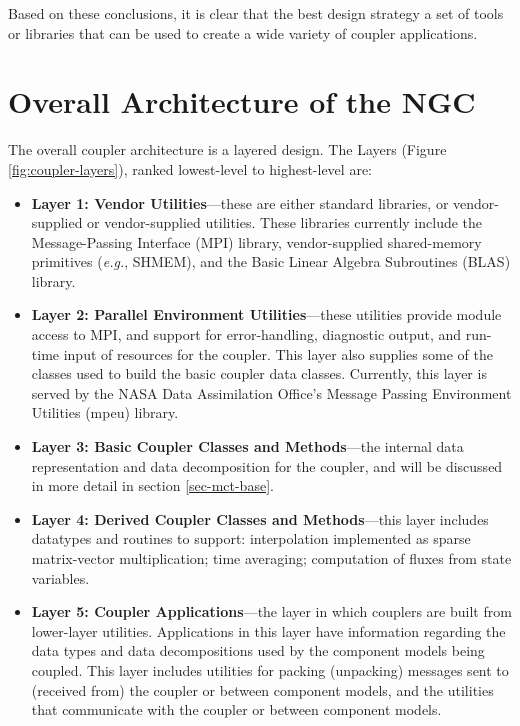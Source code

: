 \documentclass{article}
\begin{document}
Based on these conclusions, it is clear that the best design
strategy a set of tools or libraries that can be used to create a
wide variety of coupler applications.



\section{Overall Architecture of the NGC}\label{sec-arch}

The overall coupler architecture is a layered design.  The Layers
(Figure \ref{fig:coupler-layers}), ranked lowest-level to
highest-level are:
\begin{itemize}
\item {\bf Layer 1:  Vendor Utilities}---these are either standard
libraries, or vendor-supplied or vendor-supplied utilities.  These
libraries currently include the Message-Passing Interface (MPI)
library, vendor-supplied shared-memory primitives ({\em e.g.},
SHMEM), and the Basic Linear Algebra Subroutines (BLAS) library.
\item {\bf Layer 2:  Parallel Environment Utilities}---these utilities provide
module access to MPI, and support for error-handling, diagnostic
output, and run-time input of resources for the coupler.  This
layer also supplies some of the classes used to build the basic
coupler data classes.  Currently, this layer is served by the
NASA Data Assimilation Office's Message Passing Environment
Utilities (mpeu) library.
\item {\bf Layer 3:  Basic Coupler Classes and Methods}---the internal
data representation and data decomposition for the coupler, and
will be discussed in more detail in section \ref{sec-mct-base}.
\item {\bf Layer 4:  Derived Coupler Classes and Methods}---this layer includes
datatypes and routines to support:  interpolation implemented as
sparse matrix-vector multiplication; time averaging; computation
of fluxes from state variables.
\item {\bf Layer 5:  Coupler Applications}---the layer in which couplers
are built from lower-layer utilities.  Applications in this layer
have information regarding the data types and data decompositions
used by the component models being coupled.  This layer includes
utilities for packing (unpacking) messages sent to (received from)
the coupler or between component models, and the utilities that
communicate with the coupler or between component models.
\end{itemize}
\end{document}
